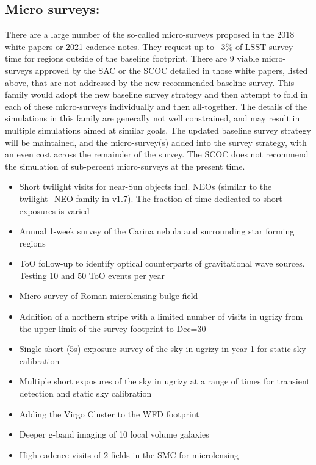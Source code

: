 \subsection{Micro surveys: }
There are a large number of the so-called micro-surveys proposed in the 2018 white papers or 2021 cadence notes. They request up to ~3\% of LSST survey time for regions outside of the baseline footprint. There are 9 viable micro-surveys approved by the SAC or the SCOC detailed in those white papers, listed above, that are not addressed by the new recommended baseline survey. This family would adopt the new baseline survey strategy and then attempt to fold in each of these micro-surveys individually and then all-together. The details of the simulations in this family are generally not well constrained, and may result in multiple simulations aimed at similar goals. The updated baseline survey strategy will be maintained, and the micro-survey(s) added into the survey strategy, with an even cost across the remainder of the survey. The SCOC does not recommend the simulation of sub-percent micro-surveys at the present time.
\begin{itemize}
\item Short twilight visits for near-Sun objects incl. NEOs (similar to the twilight\_NEO family in v1.7). The fraction of time dedicated to short exposures is varied
\item Annual 1-week survey of the Carina nebula and surrounding star forming regions
\item ToO follow-up to identify optical counterparts of gravitational wave sources. Testing 10 and 50 ToO events per year
\item Micro survey of Roman microlensing bulge field
\item Addition of a northern stripe with a limited number of visits in ugrizy from the upper limit of the survey footprint to Dec=30
\item Single short (5s) exposure survey of the sky in ugrizy in year 1 for static sky calibration %
\item Multiple short exposures of the sky in ugrizy at a range of times for transient detection and static sky calibration %
\item Adding the Virgo Cluster to the WFD footprint
\item Deeper g-band imaging of 10 local volume galaxies
\item High cadence visits of 2 fields in the SMC for microlensing
\end{itemize}

